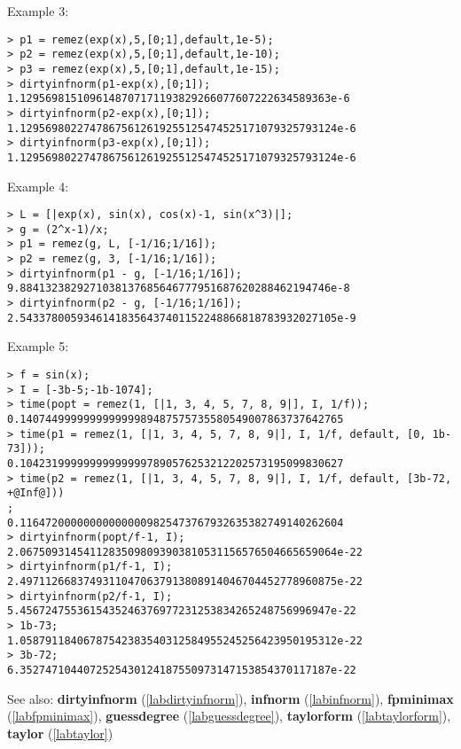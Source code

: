 \noindent Example 3: 
\begin{center}\begin{minipage}{15cm}\begin{Verbatim}[frame=single]
> p1 = remez(exp(x),5,[0;1],default,1e-5);
> p2 = remez(exp(x),5,[0;1],default,1e-10);
> p3 = remez(exp(x),5,[0;1],default,1e-15);
> dirtyinfnorm(p1-exp(x),[0;1]);
1.1295698151096148707171193829266077607222634589363e-6
> dirtyinfnorm(p2-exp(x),[0;1]);
1.12956980227478675612619255125474525171079325793124e-6
> dirtyinfnorm(p3-exp(x),[0;1]);
1.12956980227478675612619255125474525171079325793124e-6
\end{Verbatim}
\end{minipage}\end{center}
\noindent Example 4: 
\begin{center}\begin{minipage}{15cm}\begin{Verbatim}[frame=single]
> L = [|exp(x), sin(x), cos(x)-1, sin(x^3)|];
> g = (2^x-1)/x;
> p1 = remez(g, L, [-1/16;1/16]);
> p2 = remez(g, 3, [-1/16;1/16]);
> dirtyinfnorm(p1 - g, [-1/16;1/16]);
9.8841323829271038137685646777951687620288462194746e-8
> dirtyinfnorm(p2 - g, [-1/16;1/16]);
2.54337800593461418356437401152248866818783932027105e-9
\end{Verbatim}
\end{minipage}\end{center}
\noindent Example 5: 
\begin{center}\begin{minipage}{15cm}\begin{Verbatim}[frame=single]
> f = sin(x);
> I = [-3b-5;-1b-1074];
> time(popt = remez(1, [|1, 3, 4, 5, 7, 8, 9|], I, 1/f));
0.140744999999999999989487575735580549007863737642765
> time(p1 = remez(1, [|1, 3, 4, 5, 7, 8, 9|], I, 1/f, default, [0, 1b-73]));
0.104231999999999999997890576253212202573195099830627
> time(p2 = remez(1, [|1, 3, 4, 5, 7, 8, 9|], I, 1/f, default, [3b-72, +@Inf@]))
;
0.116472000000000000009825473767932635382749140262604
> dirtyinfnorm(popt/f-1, I);
2.06750931454112835098093903810531156576504665659064e-22
> dirtyinfnorm(p1/f-1, I);
2.49711266837493110470637913808914046704452778960875e-22
> dirtyinfnorm(p2/f-1, I);
5.4567247553615435246376977231253834265248756996947e-22
> 1b-73;
1.05879118406787542383540312584955245256423950195312e-22
> 3b-72;
6.3527471044072525430124187550973147153854370117187e-22
\end{Verbatim}
\end{minipage}\end{center}
See also: \textbf{dirtyinfnorm} (\ref{labdirtyinfnorm}), \textbf{infnorm} (\ref{labinfnorm}), \textbf{fpminimax} (\ref{labfpminimax}), \textbf{guessdegree} (\ref{labguessdegree}), \textbf{taylorform} (\ref{labtaylorform}), \textbf{taylor} (\ref{labtaylor})
